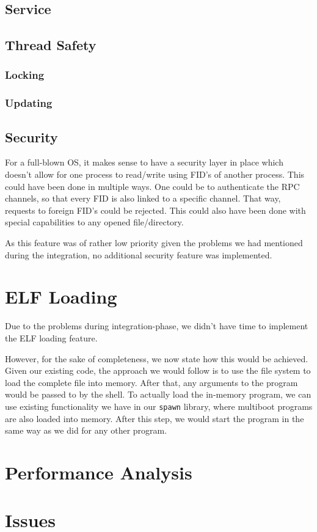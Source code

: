 \subsection{Service}

\subsection{Thread Safety}

\subsubsection{Locking}

\subsubsection{Updating}

\subsection{Security}
For a full-blown OS, it makes sense to have a security layer in place which 
doesn't allow for one process to read/write using FID's of another process.
This could have been done in multiple ways. One could be to authenticate the RPC channels,
so that every FID is also linked to a specific channel. That way, requests to foreign 
FID's could be rejected. This could also have been done with special capabilities to
any opened file/directory. 

As this feature was of rather low priority given the problems we had mentioned
during the integration, no additional security feature was implemented.

\section{ELF Loading}
Due to the problems during integration-phase, we didn't have time to implement
the ELF loading feature.

However, for the sake of completeness, we now state how this would be achieved.
Given our existing code, the approach we would follow is to use 
the file system to load the complete file into memory. After that,
any arguments to the program would be passed to by the shell.
To actually load the in-memory program, we can use existing functionality 
we have in our \texttt{spawn} library, where multiboot programs 
are also loaded into memory. After this step, we would start the program 
in the same way as we did for any other program.

\section{Performance Analysis}

\section{Issues}